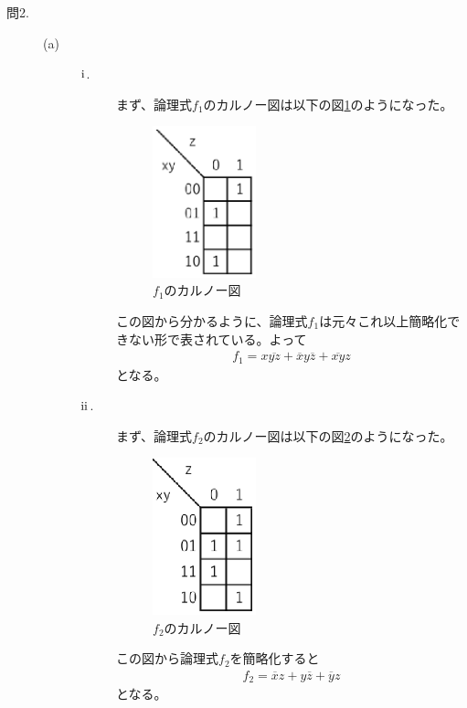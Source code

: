 \documentclass{jsarticle}
\begin{document}
\begin{description}
\begin{description}
\begin{description}
          \end{description}
      \end{description}
      \item [問2.]
      \begin{description}
          \item [(a)]
          \begin{description}
              \item [$\rm \hspace{.08em}i\hspace{.08em}$.]
              まず、論理式$f_1$のカルノー図は以下の図\ref{fig:a1}のようになった。
              \begin{figure}[H]
                  \centering
                  \includegraphics[width=3cm]{K_map1.eps}
                  \caption{$f_1$のカルノー図}
                  \label{fig:a1}
              \end{figure}
              この図から分かるように、論理式$f_1$は元々これ以上簡略化できない形で表されている。よって
              \begin{align}
                  f_1 = x\overline{yz} + \overline{x}y\overline{z} + \overline{xy}z
              \end{align}
              となる。

              \item [$\rm \hspace{.08em}ii\hspace{.08em}$.]
              まず、論理式$f_2$のカルノー図は以下の図\ref{fig:a2}のようになった。
              \begin{figure}[H]
                  \centering
                  \includegraphics[width=3cm]{K_map2.eps}
                  \caption{$f_2$のカルノー図}
                  \label{fig:a2}
              \end{figure}
              この図から論理式$f_2$を簡略化すると
              \begin{align}
                  f_2 = \overline{x}z + y\overline{z} + \overline{y}z
              \end{align}
              となる。


\end{description}
\end{description}
\end{description}
\end{document}

